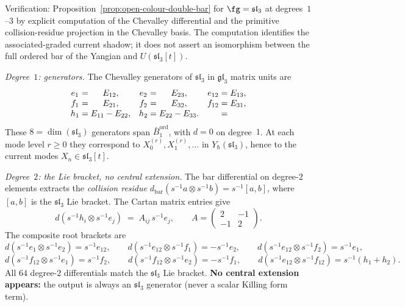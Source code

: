 \begin{computation}%
\label{comp:double-bar-sl3}%
%
Verification: Proposition~\ref{prop:open-colour-double-bar}
for $\fg=\mathfrak{sl}_3$ at degrees~$1$--$3$ by explicit
computation of the Chevalley differential and the primitive
collision-residue projection in the Chevalley basis.  The computation
identifies the associated-graded current shadow; it does not assert an
isomorphism between the full ordered bar of the Yangian and
\(U(\mathfrak{sl}_3[t])\).

\emph{Degree~$1$: generators.}\enspace
The Chevalley generators of $\mathfrak{sl}_3$ in
$\mathfrak{gl}_3$ matrix units are
\[
\begin{array}{c@{\;=\;}cc@{\;=\;}cc@{\;=\;}c}
e_1 & E_{12}, & e_2 & E_{23}, & e_{12} & E_{13}, \\
f_1 & E_{21}, & f_2 & E_{32}, & f_{12} & E_{31}, \\
h_1 & E_{11}-E_{22}, & h_2 & E_{22}-E_{33}. & &
\end{array}
\]
These $8=\dim(\mathfrak{sl}_3)$ generators span
${\bar B}^{\mathrm{ord}}_1$,
with $d=0$ on degree~$1$. At each mode level $r\ge 0$ they
correspond to $X^{(r)}_0,X^{(r)}_1,\ldots$ in
$Y_\hbar(\mathfrak{sl}_3)$, hence to the current modes
$X_{n}\in\mathfrak{sl}_3[t]$.

\emph{Degree~$2$: the Lie bracket, no central extension.}\enspace
The bar differential on degree-$2$ elements extracts the
\emph{collision residue}
$d_{\mathrm{bar}}(s^{-1}a\otimes s^{-1}b)=s^{-1}[a,b]$,
where $[a,b]$ is the $\mathfrak{sl}_3$ Lie bracket. The
Cartan matrix entries give
\[
d(s^{-1}h_i\otimes s^{-1}e_j)
\;=\;
A_{ij}\,s^{-1}e_j,
\qquad
A=\begin{pmatrix}2&-1\\-1&2\end{pmatrix}.
\]
The composite root brackets are
\[
d(s^{-1}e_1\otimes s^{-1}e_2)
=s^{-1}e_{12},
\qquad
d(s^{-1}e_{12}\otimes s^{-1}f_1)
=-s^{-1}e_2,
\qquad
d(s^{-1}e_{12}\otimes s^{-1}f_2)
=s^{-1}e_1,
\]
\[
d(s^{-1}f_{12}\otimes s^{-1}e_1)
=s^{-1}f_2,
\qquad
d(s^{-1}f_{12}\otimes s^{-1}e_2)
=-s^{-1}f_1,
\qquad
d(s^{-1}e_{12}\otimes s^{-1}f_{12})
=s^{-1}(h_1+h_2).
\]
All $64$ degree-$2$ differentials match the
$\mathfrak{sl}_3$ Lie bracket. \textbf{No central extension
appears:} the output is always an $\mathfrak{sl}_3$
generator (never a scalar Killing form term).


\end{computation}
